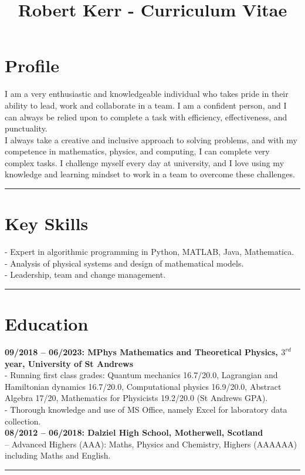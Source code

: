 \documentclass[10pt,A4,english]{article}
\title{Robert Kerr - Curriculum Vitae\vspace{-4em}}
\date{}
\begin{document}
\maketitle

\section*{Profile}
I am a very enthusiastic and knowledgeable individual who takes pride in their ability to lead, work and collaborate in a team. I am a confident person, and I can always be relied upon to complete a task with efficiency, effectiveness, and punctuality.\\
I always take a creative and inclusive approach to solving problems, and with my competence in mathematics, physics, and computing, I can complete very complex tasks. I challenge myself every day at university, and I love using my knowledge and learning mindset to work in a team to overcome these challenges.
\vspace{4pt}
\hrule height 1pt\relax


\section*{Key Skills}
 - Expert in algorithmic programming in Python, MATLAB, Java, Mathematica.\\
 - Analysis of physical systems and design of mathematical models.\\
 - Leadership, team and change management.
\vspace{4pt}
\hrule height 1pt\relax

\section*{Education}
\textbf{09/2018 -- 06/2023: MPhys Mathematics and Theoretical Physics, $3^{rd}$ year, University of St Andrews}\\
- Running first class grades: Quantum mechanics 16.7/20.0, Lagrangian and Hamiltonian dynamics 16.7/20.0, Computational physics 16.9/20.0, Abstract Algebra 17/20, Mathematics for Physicists 19.2/20.0 (St Andrews GPA).\\
 - Thorough knowledge and use of MS Office, namely Excel for laboratory data collection.\\

\textbf{08/2012 -- 06/2018: Dalziel High School, Motherwell, Scotland}\\
 -- Advanced Highers (AAA): Maths, Physics and Chemistry, Highers (AAAAAA) including Maths and English.
\vspace{4pt}
\hrule height 1pt\relax
\end{document}
